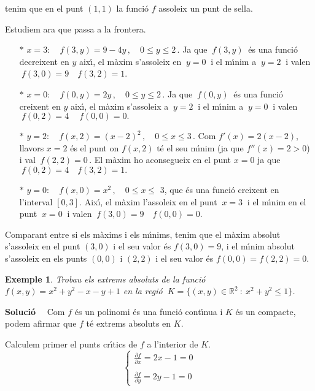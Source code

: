 \documentclass[12pt]{article}
\newcommand{\solucio}{\textbf{Soluci{\'o}}\ \ }
\newtheorem{exemple}{Exemple}[subsection]
\newcommand{\R}{\mathbb{R}}
\begin{document}
tenim que en el punt $ (1,1) $ la funci{\'o} $ f $ assoleix un punt de
sella.

Estudiem ara que passa a la frontera.
\begin{itemize}
\item[$\ast$] $ x = 3: \quad  f (3, y) =  9-4y\,,\quad 0 \leq
y \leq 2\,. $ Ja que $\ f (3, y)\ $ {\'e}s una funci{\'o} decreixent en $ y $ aix{\'\i}, el
m{\`a}xim s'assoleix en $\ y = 0\ $ i el m{\'\i}nim a $\ y = 2\ $ i valen
$\ f (3,0) = 9 \quad  f (3,2) = 1$.

\item[$\ast$] $ x = 0: \quad  f (0, y) = 2y \,,\quad 0 \leq
y \leq 2\,. $ Ja que $\ f (0, y)\ $ {\'e}s una funci{\'o} creixent en $ y $ aix{\'\i}, el
m{\`a}xim s'assoleix a $\ y = 2\ $ i el m{\'\i}nim a $\ y = 0\ $ i valen
$\ f (0,2) = 4 \quad \ f (0,0) = 0.$

\item[$\ast$] $ y = 2: \quad  f (x, 2) = (x-2) ^ 2\,,\quad 0 \leq
x \leq 3\,. $  Com $ f '(x) = 2 (x-2) $, llavors $ x = 2 $ {\'e}s
el punt on $ f (x, 2) $ t{\'e} el seu m{\'\i}nim (ja que $ f''(x) = 2> 0 $) i val $\ f (2,2) = 0\,. $
El m{\`a}xim ho aconsegueix en el punt $ x = 0 $ ja que $\  f (0,2) = 4\quad f(3,2)=1.$

\item[$\ast$] $ y = 0: \quad  f (x, 0) = x ^ 2 \,,\quad 0 \leq
x \leq $ 3, que {\'e}s una funci{\'o} creixent en l'interval $ [0,3] $.
Aix{\'\i}, el m{\`a}xim l'assoleix en el punt $\ x = 3\ $ i el m{\'\i}nim en el
punt $\ x = 0\ $ i valen $\ f (3,0) = 9 \quad f (0,0) = 0$.
\end{itemize}

Comparant entre si els m{\`a}xims i els m{\'\i}nims, tenim que el
m{\`a}xim absolut s'assoleix en el punt $ (3,0) $ i el seu valor {\'e}s
$ f (3,0) = 9 $, i el m{\'\i}nim absolut s'assoleix en els punts $ (0,0) $
i $ (2,2) $ i el seu valor {\'e}s $ f (0,0) = f (2,2) = 0 $.


\vspace{0.4cm}
\begin{exemple}\label{extr abs2}
Trobau els extrems absoluts de la funci{\'o} $ f (x, y) = x ^ 2+y^2- x -y +1 $
en la regi{\'o} $\ K=\{(x,y)\in\R^2 \ : \ x^2+y^2\leq 1 \}$.
\end{exemple}

\solucio
Com $ f $ {\'e}s un polinomi {\'e}s una funci{\'o} cont{\'\i}nua i $ K $ {\'e}s un compacte, podem afirmar que $f$ t{\'e} extrems absoluts en $K$.

Calculem primer el punts cr{\'\i}tics de $ f $ a l'interior de
$ K $.
\[
  \begin{cases}
    \displaystyle\frac{\partial f}{\partial x} = 2x-1 = 0 \\
    \\
       \displaystyle\frac{\partial f}{\partial y} =2y-1 = 0
  \end{cases}
\]
\end{document}
